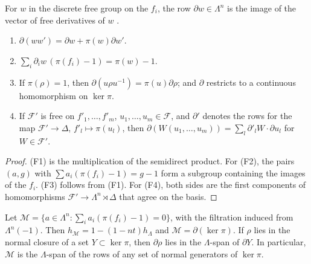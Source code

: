 For $w$ in the discrete free group on the $f_i$, the row
$\partial w\in\Lambda^n$ is the image of the vector of free derivatives of $w$
\cite[Section~2]{Fox1953}.

\begin{lemma}\label{tw:row-properties}
\begin{enumerate}
\item[(F1)] $\partial(ww')=\partial w+\pi(w)\partial w'$.
\item[(F2)] $\sum_i\partial_iw\,(\pi(f_i)-1)=\pi(w)-1$.
\item[(F3)] If $\pi(\rho)=1$, then $\partial(u\rho u^{-1})=\pi(u)\partial\rho$;
 and $\partial$ restricts to a continuous homomorphism on $\ker\pi$.
\item[(F4)] If $\mathcal F'$ is free on $f'_1,\dots,f'_m$,
 $u_1,\dots,u_m\in\mathcal F$, and $\partial'$ denotes the rows for the map
 $\mathcal F'\to\Delta$, $f'_l\mapsto\pi(u_l)$, then
 $\partial(W(u_1,\dots,u_m))=\sum_l\partial'_lW\cdot\partial u_l$ for
 $W\in\mathcal F'$.
\end{enumerate}
\end{lemma}

\begin{proof}
(F1) is the multiplication of the semidirect product. For (F2), the pairs
$(a,g)$ with $\sum a_i(\pi(f_i)-1)=g-1$ form a subgroup containing the
images of the $f_i$. (F3) follows from (F1). For (F4), both sides are the first
components of homomorphisms $\mathcal F'\to\Lambda^n\rtimes\Delta$ that agree
on the basis.
\end{proof}

\begin{lemma}\label{tw:fox-rows}
Let $\mathcal M=\{a\in\Lambda^n:\sum_ia_i(\pi(f_i)-1)=0\}$, with the
filtration induced from $\Lambda^n(-1)$. Then
$h_{\mathcal M}=1-(1-nt)h_\Lambda$ and $\mathcal M=\partial(\ker\pi)$. If
$\rho$ lies in the normal closure of a set $Y\subset\ker\pi$, then
$\partial\rho$ lies in the $\Lambda$-span of $\partial Y$. In particular,
$\mathcal M$ is the $\Lambda$-span of the rows of any set of normal
generators of $\ker\pi$.
\end{lemma}

